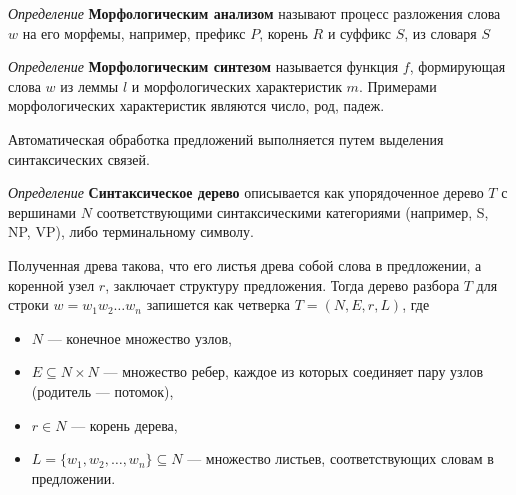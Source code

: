 \textit{Определение} \textbf{Морфологическим анализом} называют процесс разложения 
слова $w$ на его морфемы, например, префикс $P$, корень $R$ и суффикс $S$, из словаря $S$

\textit{Определение} \textbf{Морфологическим синтезом} называется функция $f$,
формирующая слова $w$ из леммы $l$ и морфологических характеристик $m$. 
Примерами морфологических характеристик являются число, род, падеж.

Автоматическая обработка предложений выполняется путем выделения синтаксических связей.

\textit{Определение} \textbf{Синтаксическое дерево} описывается как упорядоченное дерево $T$ с вершинами $N$ соответствующими
синтаксическими категориями (например, S, NP, VP), либо терминальному символу.

Полученная древа такова, что его листья древа собой слова в предложении, а коренной узел $r$, заключает структуру предложения. 
Тогда дерево разбора $T$ для строки $w = w_1 w_2 \ldots w_n$ запишется как четверка $T = (N, E, r, L)$, где \begin{itemize}
    \item $N$ — конечное множество узлов,
    \item $E \subseteq N \times N$ — множество ребер, каждое из которых соединяет пару узлов (родитель — потомок),
    \item  $r \in N$ — корень дерева,
    \item $L = \{ w_1, w_2, \ldots, w_n \} \subseteq N$ — множество листьев, соответствующих словам в предложении.
\end{itemize}